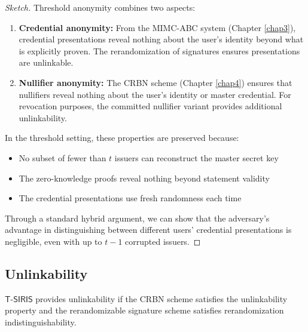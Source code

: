 \begin{proof}[Sketch]
Threshold anonymity combines two aspects:

\begin{enumerate}
    \item \textbf{Credential anonymity:} From the MIMC-ABC system (Chapter \ref{chap3}), credential presentations reveal nothing about the user's identity beyond what is explicitly proven. The rerandomization of signatures ensures presentations are unlinkable.
    
    \item \textbf{Nullifier anonymity:} The CRBN scheme (Chapter \ref{chap4}) ensures that nullifiers reveal nothing about the user's identity or master credential. For revocation purposes, the committed nullifier variant provides additional unlinkability.
\end{enumerate}

In the threshold setting, these properties are preserved because:
\begin{itemize}
    \item No subset of fewer than $t$ issuers can reconstruct the master secret key
    \item The zero-knowledge proofs reveal nothing beyond statement validity
    \item The credential presentations use fresh randomness each time
\end{itemize}

Through a standard hybrid argument, we can show that the adversary's advantage in distinguishing between different users' credential presentations is negligible, even with up to $t-1$ corrupted issuers.
\end{proof}

\subsection{Unlinkability}

\begin{theorem}[Unlinkability]
$\mathsf{T\text{-}SIRIS}$ provides unlinkability if the CRBN scheme satisfies the unlinkability property and the rerandomizable signature scheme satisfies rerandomization indistinguishability.
\end{theorem}

